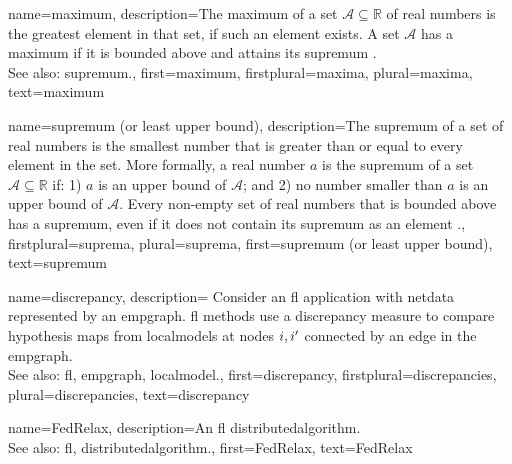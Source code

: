{name=maximum,
     description={The maximum of a set $\mathcal{A} \subseteq \mathbb{R}$ 
     	of real numbers is the greatest element in that set, if such an element exists. A set $\mathcal{A}$ 
     	has a maximum if it is bounded above and attains its \gls{supremum} \cite[Sec.~1.4]{RudinBookPrinciplesMatheAnalysis}.
				\\ 
		See also: \gls{supremum}.},
 first={maximum},
 firstplural={maxima},
 plural={maxima},
 text={maximum}
}

{name=supremum (or least upper bound),
	description={The supremum of a set of real numbers is 
		the smallest number that is greater than or equal to every element in the set. More formally, a 
		real number $a$ is the supremum of a set $\mathcal{A} \subseteq \mathbb{R}$ if: 1) $a$ 
		is an upper bound of $\mathcal{A}$; and 2) no number smaller than $a$ is an upper bound of $\mathcal{A}$. 
		Every non-empty set of real numbers that is bounded above has a supremum, even if it does 
		not contain its supremum as an element \cite[Sec.~1.4]{RudinBookPrinciplesMatheAnalysis}.},
	firstplural={suprema}, 
  	plural={suprema},
	first={supremum (or least upper bound)},
	text={supremum}
}

{name={discrepancy},
	description={
		Consider an \gls{fl} application with \gls{netdata} 
		represented by an \gls{empgraph}. \gls{fl} methods use a discrepancy measure 
		to compare \gls{hypothesis} \glspl{map} from \glspl{localmodel} at nodes $i,i'$ 
		connected by an edge in the \gls{empgraph}.
					\\ 
		See also: \gls{fl}, \gls{empgraph}, \gls{localmodel}.},
	first={discrepancy},
	firstplural={discrepancies}, 
  	plural={discrepancies}, 
	text={discrepancy}
}

{name={FedRelax},
	description={An \gls{fl} \gls{distributedalgorithm}. 
		\\ 
		See also: \gls{fl}, \gls{distributedalgorithm}.},
	first={FedRelax},
	text={FedRelax}
} 

